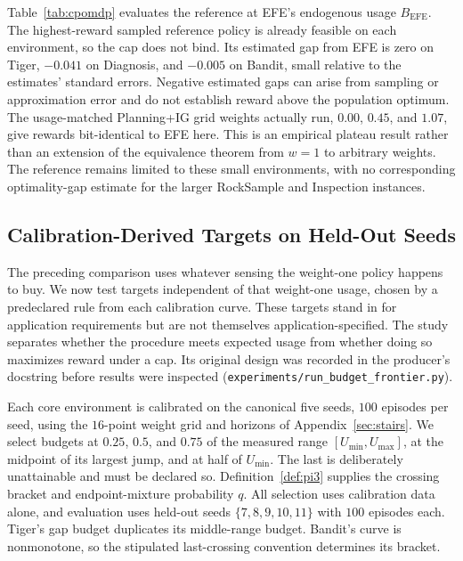 
Table~\ref{tab:cpomdp} evaluates the reference at EFE's endogenous usage $B_{\mathrm{EFE}}$. The highest-reward sampled reference policy is already feasible on each environment, so the cap does not bind. Its estimated gap from EFE is zero on Tiger, $-0.041$ on Diagnosis, and $-0.005$ on Bandit, small relative to the estimates' standard errors. Negative estimated gaps can arise from sampling or approximation error and do not establish reward above the population optimum. The usage-matched Planning+IG grid weights actually run, $0.00$, $0.45$, and $1.07$, give rewards bit-identical to EFE here. This is an empirical plateau result rather than an extension of the equivalence theorem from $w{=}1$ to arbitrary weights. The reference remains limited to these small environments, with no corresponding optimality-gap estimate for the larger RockSample and Inspection instances.

\subsection{Calibration-Derived Targets on Held-Out Seeds}
\label{sec:budget_frontier}

The preceding comparison uses whatever sensing the weight-one policy happens to buy. We now test targets independent of that weight-one usage, chosen by a predeclared rule from each calibration curve. These targets stand in for application requirements but are not themselves application-specified. The study separates whether the procedure meets expected usage from whether doing so maximizes reward under a cap. Its original design was recorded in the producer's docstring before results were inspected (\texttt{experiments/\allowbreak run\_\allowbreak budget\_\allowbreak frontier.py}).

Each core environment is calibrated on the canonical five seeds, $100$ episodes per seed, using the $16$-point weight grid and horizons of Appendix~\ref{sec:stairs}. We select budgets at $0.25$, $0.5$, and $0.75$ of the measured range $[U_{\min},U_{\max}]$, at the midpoint of its largest jump, and at half of $U_{\min}$. The last is deliberately unattainable and must be declared so. Definition~\ref{def:pi3} supplies the crossing bracket and endpoint-mixture probability $q$. All selection uses calibration data alone, and evaluation uses held-out seeds $\{7,8,9,10,11\}$ with $100$ episodes each. Tiger's gap budget duplicates its middle-range budget. Bandit's curve is nonmonotone, so the stipulated last-crossing convention determines its bracket.


